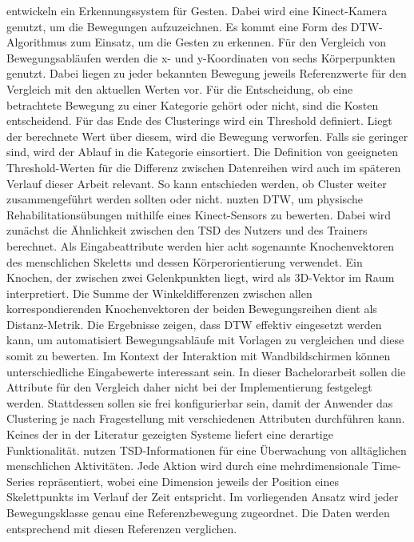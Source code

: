 \citet{wahyuni_motion_2021} entwickeln ein Erkennungssystem für Gesten.
Dabei wird eine Kinect-Kamera genutzt, um die Bewegungen aufzuzeichnen.
Es kommt eine Form des \ac{DTW}-Algorithmus zum Einsatz, um die Gesten zu erkennen.
Für den Vergleich von Bewegungsabläufen werden die x- und y-Koordinaten von sechs Körperpunkten genutzt.
Dabei liegen zu jeder bekannten Bewegung jeweils Referenzwerte für den Vergleich mit den aktuellen Werten vor.
Für die Entscheidung, ob eine betrachtete Bewegung zu einer Kategorie gehört oder nicht, sind die Kosten entscheidend.
Für das Ende des Clusterings wird ein Threshold definiert.
Liegt der berechnete Wert über diesem, wird die Bewegung verworfen.
Falls sie geringer sind, wird der Ablauf in die Kategorie einsortiert.
Die Definition von geeigneten Threshold-Werten für die Differenz zwischen Datenreihen
wird auch im späteren Verlauf dieser Arbeit relevant.
So kann entschieden werden, ob Cluster weiter zusammengeführt werden sollten oder nicht.
\citet{yu_dynamic_2019} nuzten \ac{DTW}, um physische Rehabilitationsübungen mithilfe eines Kinect-Sensors zu bewerten.
Dabei wird zunächst die Ähnlichkeit zwischen den \ac{TSD} des Nutzers und des Trainers berechnet.
Als Eingabeattribute werden hier acht sogenannte Knochenvektoren des menschlichen Skeletts und dessen Körperorientierung verwendet.
Ein Knochen, der zwischen zwei Gelenkpunkten liegt, wird als 3D-Vektor im Raum interpretiert.
Die Summe der Winkeldifferenzen zwischen allen korrespondierenden Knochenvektoren der beiden Bewegungsreihen dient
als Distanz-Metrik.
Die Ergebnisse zeigen, dass \ac{DTW} effektiv eingesetzt werden kann,
um automatisiert Bewegungsabläufe mit Vorlagen zu vergleichen und diese somit zu bewerten.
Im Kontext der Interaktion mit Wandbildschirmen können unterschiedliche Eingabewerte interessant sein.
In dieser Bachelorarbeit sollen die Attribute für den Vergleich daher nicht bei der Implementierung festgelegt werden.
Stattdessen sollen sie frei konfigurierbar sein,
damit der Anwender das Clustering je nach Fragestellung mit verschiedenen Attributen durchführen kann.
Keines der in der Literatur gezeigten Systeme liefert eine derartige Funktionalität.
\citet{mohammadzade_dynamic_2021} nutzen \ac{TSD}-Informationen für eine Überwachung von alltäglichen menschlichen Aktivitäten.
Jede Aktion wird durch eine mehrdimensionale Time-Series repräsentiert,
wobei eine Dimension jeweils der Position eines Skelettpunkts im Verlauf der Zeit entspricht.
Im vorliegenden Ansatz wird jeder Bewegungsklasse genau eine Referenzbewegung zugeordnet.
Die Daten werden entsprechend mit diesen Referenzen verglichen.
